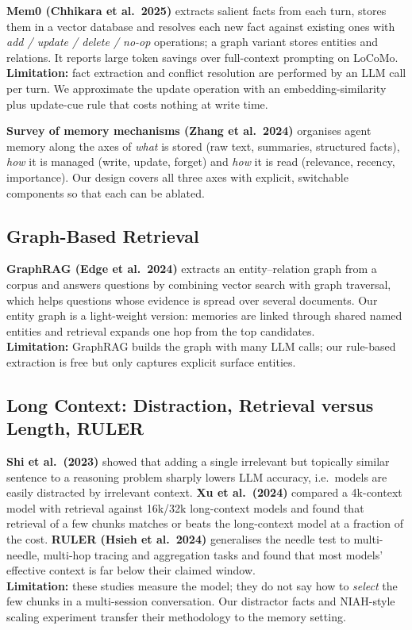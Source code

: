 \textbf{Mem0 (Chhikara et al.\ 2025)} \cite{mem0} extracts salient facts from each turn, stores them in a
vector database and resolves each new fact against existing ones with \emph{add / update / delete / no-op}
operations; a graph variant stores entities and relations. It reports large token savings over
full-context prompting on LoCoMo. \\
\textbf{Limitation:} fact extraction and conflict resolution are performed by an LLM call per turn. We
approximate the update operation with an embedding-similarity plus update-cue rule that costs nothing at
write time.

\textbf{Survey of memory mechanisms (Zhang et al.\ 2024)} \cite{memsurvey} organises agent memory along
the axes of \emph{what} is stored (raw text, summaries, structured facts), \emph{how} it is managed
(write, update, forget) and \emph{how} it is read (relevance, recency, importance). Our design covers all
three axes with explicit, switchable components so that each can be ablated.

\subsection{Graph-Based Retrieval}
\textbf{GraphRAG (Edge et al.\ 2024)} \cite{graphrag} extracts an entity--relation graph from a corpus and
answers questions by combining vector search with graph traversal, which helps questions whose evidence is
spread over several documents. Our entity graph is a light-weight version: memories are linked through
shared named entities and retrieval expands one hop from the top candidates. \\
\textbf{Limitation:} GraphRAG builds the graph with many LLM calls; our rule-based extraction is free but
only captures explicit surface entities.

\subsection{Long Context: Distraction, Retrieval versus Length, RULER}
\textbf{Shi et al.\ (2023)} \cite{distracted} showed that adding a single irrelevant but topically similar
sentence to a reasoning problem sharply lowers LLM accuracy, i.e.\ models are easily distracted by
irrelevant context. \textbf{Xu et al.\ (2024)} \cite{retrievalmeetslong} compared a 4k-context model with
retrieval against 16k/32k long-context models and found that retrieval of a few chunks matches or beats
the long-context model at a fraction of the cost. \textbf{RULER (Hsieh et al.\ 2024)} \cite{ruler}
generalises the needle test to multi-needle, multi-hop tracing and aggregation tasks and found that most
models' effective context is far below their claimed window. \\
\textbf{Limitation:} these studies measure the model; they do not say how to \emph{select} the few chunks
in a multi-session conversation. Our distractor facts and NIAH-style scaling experiment transfer their
methodology to the memory setting.

